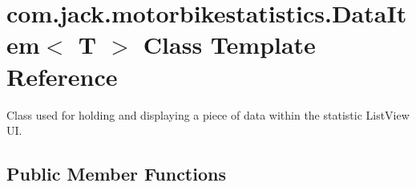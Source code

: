 \hypertarget{classcom_1_1jack_1_1motorbikestatistics_1_1_data_item}{}\section{com.\+jack.\+motorbikestatistics.\+Data\+Item$<$ T $>$ Class Template Reference}
\label{classcom_1_1jack_1_1motorbikestatistics_1_1_data_item}


Class used for holding and displaying a piece of data within the statistic List\+View UI.  


\subsection*{Public Member Functions}

